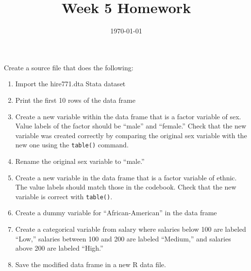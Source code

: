 \documentclass[11pt, oneside]{article}   	%
\title{Week 5 Homework}
\date{\today}							%
\begin{document}
\maketitle

Create a source file that does the following:

\begin{enumerate}
\item Import the hire771.dta Stata dataset
\item Print the first 10 rows of the data frame
\item Create a new variable within the data frame that is a factor variable of sex. Value labels of the factor should be  ``male'' and ``female.'' Check that the new variable was created correctly by comparing the original sex variable with the new one using the \texttt{table()} command.
\item Rename the original sex variable to ``male.''
\item Create a new variable in the data frame that is a factor variable of ethnic. The value labels should match those in the codebook. Check that the new variable is correct with \texttt{table()}.
\item Create a dummy variable for ``African-American'' in the data frame
\item Create a categorical variable from salary where salaries below 100 are labeled ``Low,'' salaries between 100 and 200 are labeled ``Medium,'' and salaries above 200 are labeled ``High.''
\item Save the modified data frame in a new R data file.
\end{enumerate}
\end{document}
